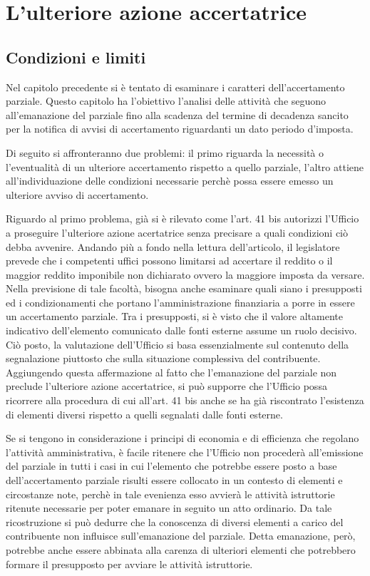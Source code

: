 \chapter{L'ulteriore azione accertatrice}
\section{Condizioni e limiti}
Nel capitolo precedente si è tentato di esaminare i caratteri dell'accertamento parziale. Questo capitolo ha l'obiettivo l'analisi delle attività che seguono all'emanazione del parziale fino alla scadenza del termine di decadenza sancito per la notifica di avvisi di accertamento riguardanti un dato periodo d'imposta.

Di seguito si affronteranno due problemi: il primo riguarda la necessità o l'eventualità di un ulteriore accertamento rispetto a quello parziale, l'altro attiene all'individuazione delle condizioni necessarie perchè possa essere emesso un ulteriore avviso di accertamento.

Riguardo al primo problema, già si è rilevato come l'art. 41 bis autorizzi l'Ufficio a proseguire l'ulteriore azione acertatrice senza precisare a quali condizioni ciò debba avvenire.
Andando più a fondo nella lettura dell'articolo, il legislatore prevede che i competenti uffici possono limitarsi ad accertare il reddito o il maggior reddito imponibile non dichiarato ovvero la maggiore imposta da versare. Nella previsione di tale facoltà, bisogna anche esaminare quali siano i presupposti ed i condizionamenti che portano l'amministrazione finanziaria a porre in essere un accertamento parziale. Tra i presupposti, si è visto che il valore altamente indicativo dell'elemento comunicato dalle fonti esterne assume un ruolo decisivo. Ciò posto, la valutazione dell'Ufficio si basa essenzialmente sul contenuto della segnalazione piuttosto che sulla situazione complessiva del contribuente. Aggiungendo questa affermazione al fatto che l'emanazione del parziale non preclude l'ulteriore azione accertatrice, si può supporre che l'Ufficio possa ricorrere alla procedura di cui all'art. 41 bis anche se ha già riscontrato l'esistenza di elementi diversi rispetto a quelli segnalati dalle fonti esterne.

Se si tengono in considerazione i principi di economia e di efficienza che regolano l'attività amministrativa, è facile ritenere che l'Ufficio non procederà all'emissione del parziale in tutti i casi in cui l'elemento che potrebbe essere posto a base dell'accertamento parziale risulti essere collocato in un contesto di elementi e circostanze note, perchè in tale evenienza esso avvierà le attività istruttorie ritenute necessarie per poter emanare in seguito un atto ordinario. Da tale ricostruzione si può dedurre che la conoscenza di diversi elementi a carico del contribuente non influisce sull'emanazione del parziale. Detta emanazione, però, potrebbe anche essere abbinata alla carenza di ulteriori elementi che potrebbero formare il presupposto per avviare le attività istruttorie.

